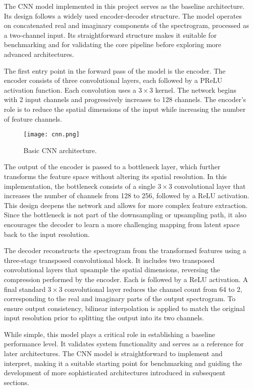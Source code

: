 The CNN model implemented in this project serves as the baseline architecture. Its design follows a widely used encoder-decoder structure. The model operates on concatenated real and imaginary components of the spectrogram, processed as a two-channel input. Its straightforward structure makes it suitable for benchmarking and for validating the core pipeline before exploring more advanced architectures.

The first entry point in the forward pass of the model is the encoder. The encoder consists of three convolutional layers, each followed by a PReLU activation function. Each convolution uses a \(3 \times 3\) kernel. The network begins with 2 input channels and progressively increases to 128 channels. The encoder's role is to reduce the spatial dimensions of the input while increasing the number of feature channels.

\begin{figure}[h]
    \centering
    \texttt{[image: cnn.png]}
    \caption{\label{fig:cnn}Basic CNN architecture.}
\end{figure}

The output of the encoder is passed to a bottleneck layer, which further transforms the feature space without altering its spatial resolution. In this implementation, the bottleneck consists of a single \(3 \times 3\) convolutional layer that increases the number of channels from 128 to 256, followed by a ReLU activation. This design deepens the network and allows for more complex feature extraction. Since the bottleneck is not part of the downsampling or upsampling path, it also encourages the decoder to learn a more challenging mapping from latent space back to the input resolution.

The decoder reconstructs the spectrogram from the transformed features using a three-stage transposed convolutional block. It includes two transposed convolutional layers that upsample the spatial dimensions, reversing the compression performed by the encoder. Each is followed by a ReLU activation. A final standard \(3 \times 3\) convolutional layer reduces the channel count from 64 to 2, corresponding to the real and imaginary parts of the output spectrogram. To ensure output consistency, bilinear interpolation is applied to match the original input resolution prior to splitting the output into its two channels.

While simple, this model plays a critical role in establishing a baseline performance level. It validates system functionality and serves as a reference for later architectures. The CNN model is straightforward to implement and interpret, making it a suitable starting point for benchmarking and guiding the development of more sophisticated architectures introduced in subsequent sections.

